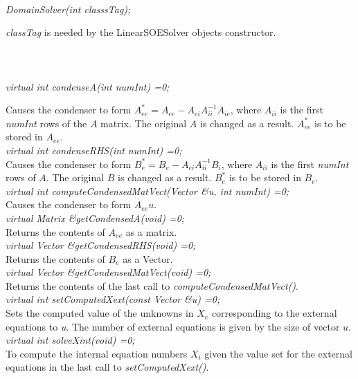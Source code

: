   \\
{\em DomainSolver(int classsTag);}  

{\em classTag} is needed by the LinearSOESolver objects constructor. \\

 \\
\\ 

  \\
{\em virtual int condenseA(int numInt) =0;} 

Causes the condenser to form $A_{ee}^* = A_{ee} -A_{ei} A_{ii}^{-1} A_{ie}$, where
$A_{ii}$ is the first {\em numInt} rows of the $A$ matrix.  The
original $A$ is changed as a result. $A_{ee}^*$ is to be stored in $A_{ee}$. \\

{\em virtual int condenseRHS(int numInt) =0;} \\
Causes the condenser to form $B_e^* = B_e - A_{ei} A_{ii}^{-1} B_i$, where $A_{ii}$ 
is the first {\em numInt} rows of $A$. The original $B$ is changed as a result. 
$B_e^*$ is to be stored in $B_e$. \\

{\em virtual int computeCondensedMatVect(Vector \&u, int numInt) =0;} \\
Causes the condenser to form $A_{ee} u$. \\

{\em virtual Matrix \&getCondensedA(void) =0;} \\
Returns the contents of $A_{ee}$ as a matrix. \\

{\em virtual Vector \&getCondensedRHS(void) =0;} \\
Returns the contents of $B_e$ as a Vector. \\

{\em virtual Vector \&getCondensedMatVect(void) =0;} \\
Returns the contents of the last call to {\em
computeCondensedMatVect()}. \\

{\em virtual int setComputedXext(const Vector \&u) =0;} \\
Sets the computed value of the unknowns in $X_e$ corresponding to the
external equations to {\em u}. The number of external equations is
given by the size of vector $u$.\\

{\em  virtual int solveXint(void) =0;} \\
To compute the internal equation numbers $X_i$ given the value set
for the external equations in the last call to {\em setComputedXext()}. \\

